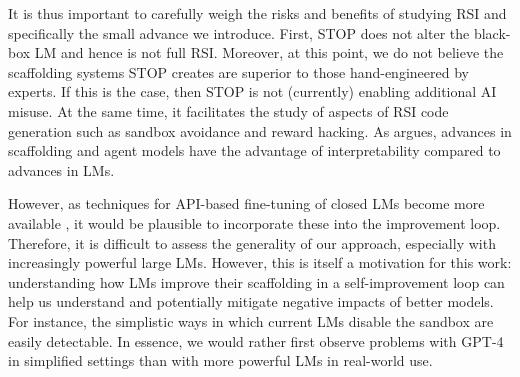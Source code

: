 \documentclass{article}
\begin{document}
It is thus important to carefully weigh the risks and benefits of studying RSI and specifically the small advance we introduce. First, STOP does not alter the black-box LM and hence is not full RSI. Moreover, at this point, we do not believe the scaffolding systems STOP creates are superior to those hand-engineered by experts. If this is the case, then STOP is not (currently) enabling additional AI misuse. At the same time, it facilitates the study of aspects of RSI code generation such as sandbox avoidance and reward hacking. As \citet{paulfchristiano_thoughts_2023paper} argues, advances in scaffolding and agent models have the advantage of interpretability compared to advances in LMs.

However, as techniques for API-based fine-tuning of closed LMs become more available \citep{gpt3finetuning}, it would be plausible to incorporate these into the improvement loop. Therefore, it is difficult to assess the generality of our approach, especially with increasingly powerful large LMs. However, this is itself a motivation for this work: understanding how LMs improve their scaffolding in a self-improvement loop can help us understand and potentially mitigate negative impacts of better models. For instance, the simplistic ways in which current LMs disable the sandbox are easily detectable. In essence, we would rather first observe problems with GPT-4 in simplified settings than with more powerful LMs in real-world use.











\newpage



\appendix
\renewcommand{\thefigure}{A.\arabic{figure}}
\setcounter{table}{0}  
\renewcommand{\thetable}{A.\arabic{table}}
\end{document}
